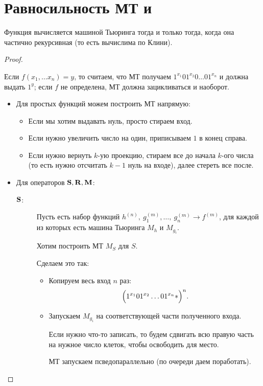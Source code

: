 \section{Равносильность МТ и \crf}
\begin{thm}
	Функция вычисляется машиной Тьюринга тогда и только тогда, когда она частично рекурсивная (то есть вычислима по Клини).
\end{thm}
\begin{proof}
    \begin{description}
        \item {} 
			Если $ f(x_1, \ldots x_n) = y$, то считаем, что МТ получаем $ 1^{x_1}01^{x_2}0\ldots 01^{x_n}$ и должна выдать $ 1^{y}$; если  $ f$ не определена, МТ должна зацикливаться и наоборот.
			\begin{itemize}
				\item Для простых функций можем построить МТ напрямую:
					\begin{itemize}
						\item Если мы хотим выдавать нуль, просто стираем вход.
						\item Если нужно увеличить число на один, приписываем $ 1$ в конец справа.
						\item Если нужно вернуть $ k$-ую проекцию, стираем все до начала $ k$-ого числа (то есть нужно отсчитать $ k-1$ нуль на входе), далее стереть все после.
					\end{itemize}
				\item Для операторов $ \S, \R, \M$:
					\begin{description}
						\item[$ \S$:]
							Пусть есть набор функций $ h^{(n)}, ~ g_1^{(m)}, \ldots , ~ g_n^{(m)} \longrightarrow f^{(m)}$, для каждой из которых есть машина Тьюринга $ M_{h}$ и $ M_{g_{i}}$. 

							Хотим построить МТ $ M_{S}$ для $ S$.

							Сделаем это так:
							\begin{itemize}
								\item Копируем весь вход $ n$ раз:
									\[
										\Bigl(1^{x_1}01^{x_2}\ldots 01^{x_n} \ast \Bigr)^{n}
									.\] 
								\item Запускаем $ M_{g_i}$ на соответствующей части полученного входа. 

							Если нужно что-то записать, то будем сдвигать всю правую часть на нужное число клеток, чтобы освободить для место.

							МТ запускаем  псведопараллельно (по очереди даем поработать).


\end{itemize}
\end{description}
\end{itemize}
\end{description}
\end{proof}
